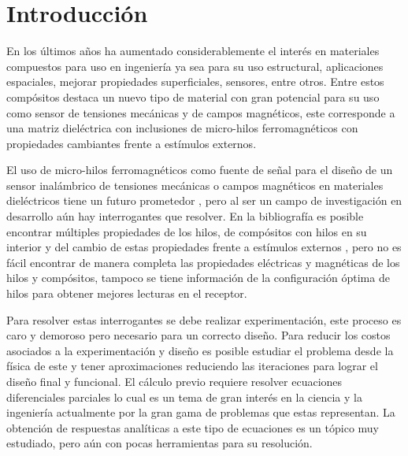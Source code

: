 \documentclass[12pt,letterpaper]{article}
\numberwithin{equation}{section}
\begin{document}
\section{Introducción}
En los últimos años  ha aumentado considerablemente el interés en materiales compuestos para uso en ingeniería ya sea para su uso estructural, aplicaciones espaciales, mejorar propiedades superficiales, sensores, entre otros. Entre estos compósitos destaca un nuevo tipo de material con gran potencial para su uso como sensor de tensiones mecánicas y de campos magnéticos, este corresponde a una matriz dieléctrica con inclusiones de micro-hilos ferromagnéticos con propiedades cambiantes frente a estímulos externos.

El uso de micro-hilos ferromagnéticos como fuente de señal para el diseño de un sensor inalámbrico de tensiones mecánicas o campos magnéticos en materiales dieléctricos tiene un futuro prometedor \cite{Wire_intro}, pero al ser un campo de investigación en desarrollo aún hay interrogantes que resolver. En la bibliografía es posible encontrar múltiples propiedades de los hilos, de compósitos con hilos en su interior y del cambio de estas propiedades frente a estímulos externos \cite{Wire_intro,Wire_backgound,Wire_permeability}, pero no es fácil encontrar de manera completa las propiedades eléctricas y magnéticas de los hilos y compósitos, tampoco se tiene información de la configuración óptima de hilos para obtener mejores lecturas en el receptor. 

Para resolver estas interrogantes se debe realizar experimentación, este proceso es caro y demoroso pero necesario para un correcto diseño. Para reducir los costos asociados a la experimentación y diseño es posible estudiar el problema desde la física de este y tener aproximaciones reduciendo las iteraciones para lograr el diseño final y funcional. El cálculo previo requiere resolver ecuaciones diferenciales parciales lo cual es un tema de gran interés en la ciencia y la ingeniería actualmente por la gran gama de problemas que estas representan. La obtención de respuestas analíticas a este tipo de ecuaciones es un tópico muy estudiado, pero aún con pocas herramientas para su resolución.
\end{document}
